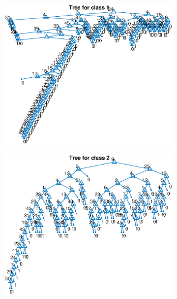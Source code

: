 \documentclass{article}
\begin{document}
\begin{figure}
 \centering
 \begin{subfigure}[b]{.49\textwidth}
   \includegraphics[width=\textwidth]{tree1.eps}
 \end{subfigure}
 \begin{subfigure}[b]{.49\textwidth}
   \includegraphics[width=\textwidth]{tree2.eps}
 \end{subfigure}
 \begin{subfigure}[b]{.49\textwidth}

\end{subfigure}
\end{figure}
\end{document}
